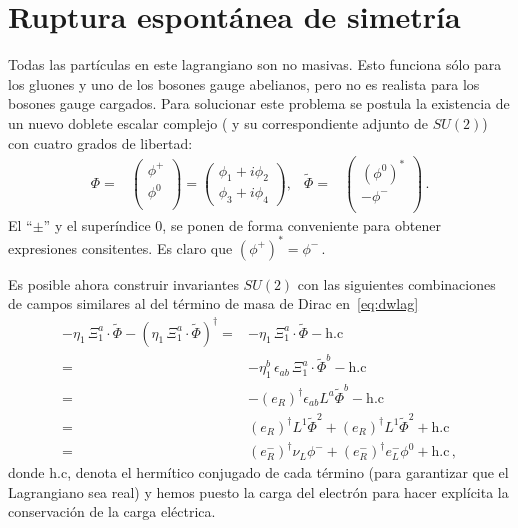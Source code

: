 \section{Ruptura espontánea de simetría}
\label{sec:rupt-espont-de}

\begin{frame}
Todas las partículas en este lagrangiano son no masivas. Esto funciona sólo para los gluones y uno de los bosones gauge abelianos, pero no es realista para los bosones gauge cargados. 
Para solucionar este problema se postula la existencia de un nuevo doblete escalar complejo
( y su correspondiente adjunto de $SU(2)$) con cuatro grados de libertad:
\begin{align}
\label{eq:Phi}
  \Phi=&
  \begin{pmatrix}
    \phi^+\\
    \phi^0\\
  \end{pmatrix}=
  \begin{pmatrix}
    \phi_1+i\phi_2\\
\phi_3+i\phi_4
  \end{pmatrix},&
\widetilde{\Phi}=&
  \begin{pmatrix}
    \left( \phi^0 \right)^{*}\\
   -\phi^-\\
  \end{pmatrix}\,.
\end{align}
El  ``$\pm$'' y el superíndice 0, se ponen de forma conveniente para obtener expresiones consitentes. Es claro que $\left( \phi^+ \right)^{*}=\phi^-\,.$





Es posible ahora construir invariantes $SU(2)$ con las siguientes combinaciones de campos similares al del término de masa de Dirac en~\eqref{eq:dwlag}
\begin{align}
 -\eta_1\,\Xi_1^{a}\cdot\widetilde{\Phi}-\left(\eta_1\,\Xi_1^{a}\cdot\widetilde{\Phi}  \right)^{\dagger}
 =& -\eta_1\,\Xi_1^{a}\cdot\widetilde{\Phi}-\text{h.c}\nonumber\\
 =& -\eta^{b}_1\,\epsilon_{ab}\,\Xi_1^{a}\cdot\widetilde{\Phi}^{b}-\text{h.c} \nonumber\\
   =&-\left( e_R \right)^{\dagger}\epsilon_{ab}L^a\widetilde{\Phi}^b -\text{h.c} \nonumber\\
   =&\left( e_R \right)^{\dagger}L^1\widetilde{\Phi}^2+\left( e_R \right)^{\dagger}L^1\widetilde{\Phi}^2 +\text{h.c} \nonumber\\
   =&\left( e_R^{-} \right)^{\dagger}\nu_L\phi^- +\left( e_R^{-} \right)^{\dagger}e_L^-\phi^0 +\text{h.c} \,,
 \end{align}
donde $\text{h.c}$, denota el hermítico conjugado de cada término (para garantizar que el Lagrangiano sea real)
y hemos puesto la carga del electrón para hacer explícita la conservación de la carga eléctrica. 


\end{frame}
